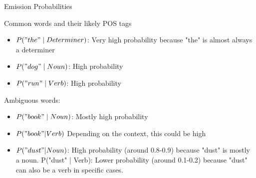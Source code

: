     \begin{frame}{Emission Probabilities}
     \begin{block}{Common words and their likely POS tags}
        \begin{itemize}
            \item $P("the" \mid Determiner)$: Very high probability because "the" is almost always a determiner
            \item $P("dog" \mid Noun)$: High probability
            \item $P("run" \mid Verb)$: High probability
        \end{itemize}
\end{block}
\begin{block}{Ambiguous words:}
\begin{itemize}
    \item   $P("book" \mid Noun)$: Mostly high probability
    \item $P("book" | Verb)$ Depending on the context, this could be high
    \item $P("dust" | Noun)$: High probability (around 0.8-0.9) because "dust" is mostly a noun.
    P("dust" | Verb): Lower probability (around 0.1-0.2) because "dust" can also be a verb in specific cases.
\end{itemize}
\end{block}
    \end{frame}
%
